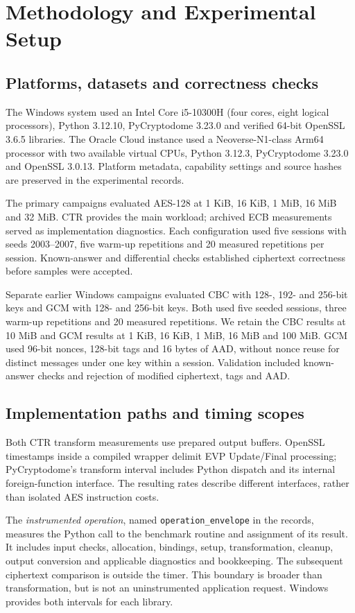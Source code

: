 \section{Methodology and Experimental Setup}
\label{sec:method}
\subsection{Platforms, datasets and correctness checks}
The Windows system used an Intel Core i5-10300H (four cores, eight logical processors), Python 3.12.10, PyCryptodome 3.23.0 and verified 64-bit OpenSSL 3.6.5 libraries. The Oracle Cloud instance used a Neoverse-N1-class Arm64 processor with two available virtual CPUs, Python 3.12.3, PyCryptodome 3.23.0 and OpenSSL 3.0.13. Platform metadata, capability settings and source hashes are preserved in the experimental records.

The primary campaigns evaluated AES-128 at 1 KiB, 16 KiB, 1 MiB, 16 MiB and 32 MiB. CTR provides the main workload; archived ECB measurements served as implementation diagnostics. Each configuration used five sessions with seeds 2003--2007, five warm-up repetitions and 20 measured repetitions per session. Known-answer and differential checks established ciphertext correctness before samples were accepted.

Separate earlier Windows campaigns evaluated CBC with 128-, 192- and 256-bit keys and GCM with 128- and 256-bit keys. Both used five seeded sessions, three warm-up repetitions and 20 measured repetitions. We retain the CBC results at 10 MiB and GCM results at 1 KiB, 16 KiB, 1 MiB, 16 MiB and 100 MiB. GCM used 96-bit nonces, 128-bit tags and 16 bytes of AAD, without nonce reuse for distinct messages under one key within a session. Validation included known-answer checks and rejection of modified ciphertext, tags and AAD.

\subsection{Implementation paths and timing scopes}
Both CTR transform measurements use prepared output buffers. OpenSSL timestamps inside a compiled wrapper delimit EVP Update/Final processing; PyCryptodome's transform interval includes Python dispatch and its internal foreign-function interface. The resulting rates describe different interfaces, rather than isolated AES instruction costs.

The \emph{instrumented operation}, named \texttt{operation\_envelope} in the records, measures the Python call to the benchmark routine and assignment of its result. It includes input checks, allocation, bindings, setup, transformation, cleanup, output conversion and applicable diagnostics and bookkeeping. The subsequent ciphertext comparison is outside the timer. This boundary is broader than transformation, but is not an uninstrumented application request. Windows provides both intervals for each library.

